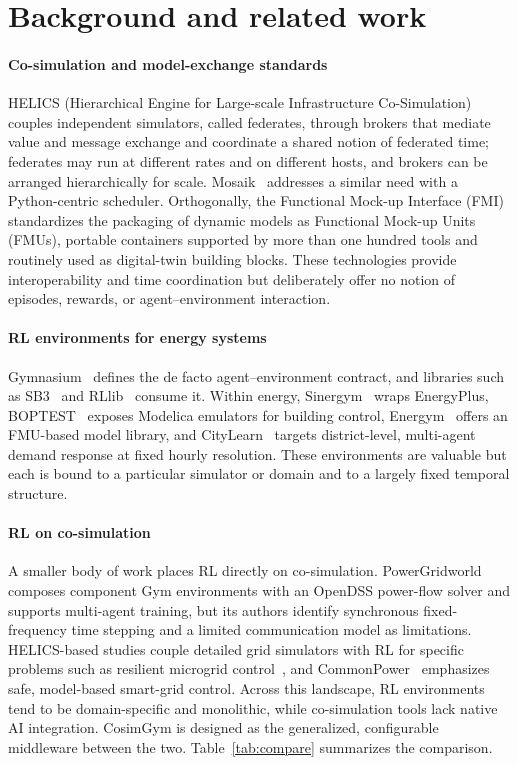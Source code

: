 \documentclass[preprint,12pt]{elsarticle}
\begin{document}
\section{Background and related work}\label{sec:background}
\paragraph{Co-simulation and model-exchange standards}
HELICS (Hierarchical Engine for Large-scale Infrastructure
Co-Simulation)~\cite{helics} couples independent simulators, called federates,
through brokers that mediate value and message exchange and coordinate a shared
notion of federated time; federates may run at different rates and on different
hosts, and brokers can be arranged hierarchically for scale. Mosaik~\cite{mosaik}
addresses a similar need with a Python-centric scheduler. Orthogonally, the
Functional Mock-up Interface (FMI)~\cite{fmi} standardizes the packaging of
dynamic models as Functional Mock-up Units (FMUs), portable containers supported
by more than one hundred tools and routinely used as digital-twin building
blocks. These technologies provide interoperability and time coordination but
deliberately offer no notion of episodes, rewards, or agent--environment
interaction.

\paragraph{RL environments for energy systems}
Gymnasium~\cite{gymnasium} defines the de facto agent--environment contract, and
libraries such as SB3~\cite{sb3} and RLlib~\cite{rllib} consume it. Within energy,
Sinergym~\cite{sinergym} wraps EnergyPlus, BOPTEST~\cite{boptest} exposes Modelica
emulators for building control, Energym~\cite{energym} offers an FMU-based model
library, and CityLearn~\cite{citylearn} targets district-level, multi-agent
demand response at fixed hourly resolution. These environments are valuable but
each is bound to a particular simulator or domain and to a largely fixed temporal
structure.

\paragraph{RL on co-simulation}
A smaller body of work places RL directly on co-simulation.
PowerGridworld~\cite{powergridworld} composes component Gym environments with an
OpenDSS power-flow solver and supports multi-agent training, but its authors
identify synchronous fixed-frequency time stepping and a limited communication
model as limitations. HELICS-based studies couple detailed grid simulators with
RL for specific problems such as resilient microgrid control~\cite{frl_microgrid},
and CommonPower~\cite{commonpower} emphasizes safe, model-based smart-grid
control. Across this landscape, RL environments tend to be domain-specific and
monolithic, while co-simulation tools lack native AI integration. CosimGym is
designed as the generalized, configurable middleware between the two.
Table~\ref{tab:compare} summarizes the comparison.
\end{document}
